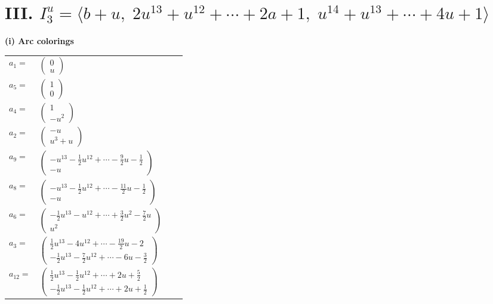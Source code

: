 \documentclass[1p]{elsarticle_modified}
\theoremstyle{definition}
\begin{document}
\centering \section*{III. $I^u_{3}= \langle b+u,\;2 u^{13}+u^{12}+\cdots+2 a+1,\;u^{14}+u^{13}+\cdots+4 u+1 \rangle$}
\flushleft \textbf{(i) Arc colorings}\\
\begin{tabular}{m{7pt} m{180pt} m{7pt} m{180pt} }
\flushright $a_{1}=$&$\begin{pmatrix}0\\u\end{pmatrix}$ \\
\flushright $a_{5}=$&$\begin{pmatrix}1\\0\end{pmatrix}$ \\
\flushright $a_{4}=$&$\begin{pmatrix}1\\- u^2\end{pmatrix}$ \\
\flushright $a_{2}=$&$\begin{pmatrix}- u\\u^3+u\end{pmatrix}$ \\
\flushright $a_{9}=$&$\begin{pmatrix}- u^{13}-\frac{1}{2} u^{12}+\cdots-\frac{9}{2} u-\frac{1}{2}\\- u\end{pmatrix}$ \\
\flushright $a_{8}=$&$\begin{pmatrix}- u^{13}-\frac{1}{2} u^{12}+\cdots-\frac{11}{2} u-\frac{1}{2}\\- u\end{pmatrix}$ \\
\flushright $a_{6}=$&$\begin{pmatrix}-\frac{1}{2} u^{13}- u^{12}+\cdots+\frac{3}{2} u^2-\frac{7}{2} u\\u^2\end{pmatrix}$ \\
\flushright $a_{3}=$&$\begin{pmatrix}\frac{1}{2} u^{13}-4 u^{12}+\cdots-\frac{19}{2} u-2\\-\frac{1}{2} u^{13}-\frac{7}{2} u^{12}+\cdots-6 u-\frac{3}{2}\end{pmatrix}$ \\
\flushright $a_{12}=$&$\begin{pmatrix}\frac{1}{2} u^{13}-\frac{1}{2} u^{12}+\cdots+2 u+\frac{5}{2}\\-\frac{1}{2} u^{13}-\frac{1}{2} u^{12}+\cdots+2 u+\frac{1}{2}\end{pmatrix}$ \\

\end{tabular}
\end{document}

